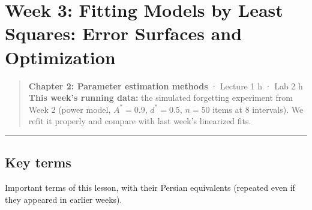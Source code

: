 \section{Week 3: Fitting Models by Least Squares: Error Surfaces and
Optimization}

\begin{quote}
\textbf{Chapter 2: Parameter estimation methods} · Lecture 1 h · Lab 2 h
\textbf{This week's running data:} the simulated forgetting experiment
from Week 2 (power model, \(A^\ast = 0.9\), \(d^\ast = 0.5\), \(n = 50\)
items at 8 intervals). We refit it properly and compare with last week's
linearized fits.
\end{quote}

\begin{center}\rule{0.5\linewidth}{0.5pt}\end{center}

\subsection{Key terms}

Important terms of this lesson, with their Persian equivalents (repeated
even if they appeared in earlier weeks).

